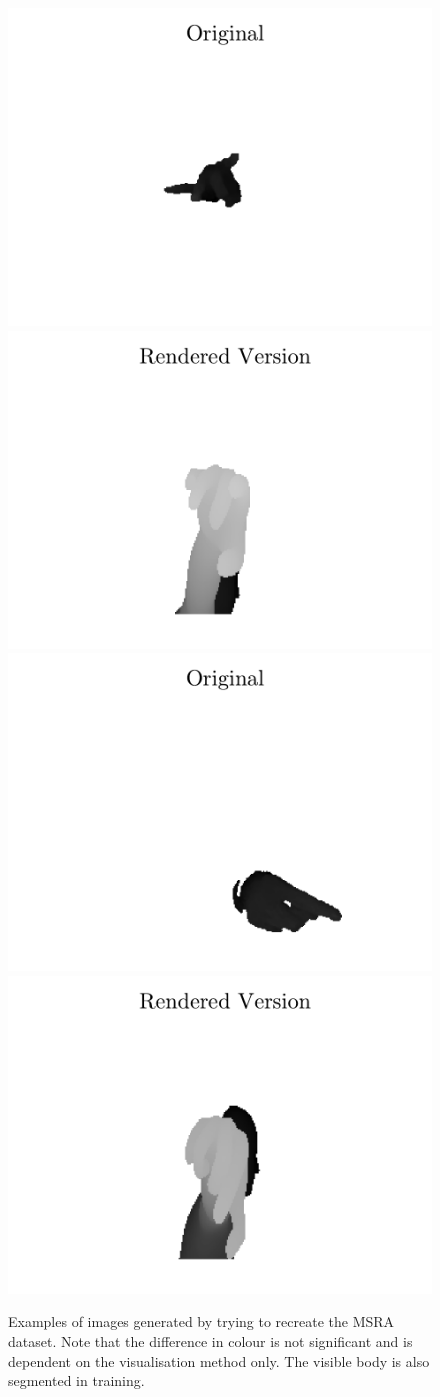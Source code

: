 \begin{figure}
    \includegraphics[width=0.48\linewidth]{figs/d_mano/original3.pdf}
    \includegraphics[width=0.48\linewidth]{figs/d_mano/rendered3.pdf}
    \includegraphics[width=0.48\linewidth]{figs/d_mano/original4.pdf}
    \includegraphics[width=0.48\linewidth]{figs/d_mano/rendered4.pdf}
\caption{Examples of images generated by trying to recreate the MSRA dataset. Note that the difference in colour is not significant and is dependent on the visualisation method only. The visible body is also segmented in training.}
\label{fig:sd:d}
\end{figure}


